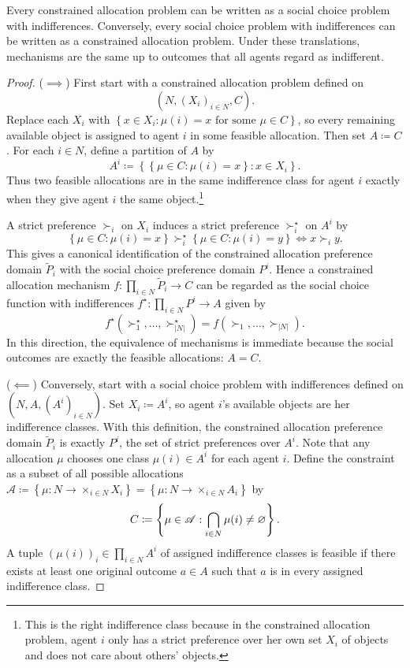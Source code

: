 \begin{proposition}
	Every constrained allocation problem can be written as a social choice problem with indifferences. Conversely, every social choice problem with indifferences can be written as a constrained allocation problem. Under these translations, mechanisms are the same up to outcomes that all agents regard as indifferent.
\end{proposition}
\begin{proof}
	($\implies$) First start with a constrained allocation problem defined on \[
		\left( N, \left( X_i \right)_{i \in N}, C \right)
	.\] 
	Replace each $X_i$ with $\left\{x \in X_i: \mu(i) = x \text{ for some } \mu \in C\right\}$, so every remaining available object is assigned to agent $i$ in some feasible allocation. Then set $A \coloneqq C$.
	For each $i \in N$, define a partition of $A$ by \[
		A^i \coloneqq \left\{ \left\{\mu \in C: \mu(i) = x\right\}: x \in X_i \right\}
	.\] 
	Thus two feasible allocations are in the same indifference class for agent $i$ exactly when they give agent $i$ the same object.\footnote{This is the right indifference class because in the constrained allocation problem, agent $i$ only has a strict preference over her own set $X_i$ of objects and does not care about others' objects.}

	A strict preference $\succ_i$ on $X_i$ induces a strict preference $\succ_i^\star$ on $A^i$ by \[
		\left\{\mu \in C: \mu(i) = x\right\} \succ_i^\star \left\{\mu \in C: \mu(i) = y\right\} \iff x \succ_i y
	.\] 
	This gives a canonical identification of the constrained allocation preference domain $\tilde{P}_i$ with the social choice preference domain $P^i$.
	Hence a constrained allocation mechanism $f: \prod_{i \in N}^{} \tilde{P}_i \to C$ can be regarded as the social choice function with indifferences $f^\star: \prod_{i \in N}^{} P^i \to A$ given by \[
		f^\star\left( \succ_1^\star,\ldots,\succ_{\left| N \right|}^\star \right)
		=
		f\left( \succ_1,\ldots,\succ_{\left| N \right|} \right)
	.\] 
	In this direction, the equivalence of mechanisms is immediate because the social outcomes are exactly the feasible allocations: $A=C$.

	\medskip

	($\impliedby$) Conversely, start with a social choice problem with indifferences defined on $\left( N,A,\left( A^i \right)_{i \in N} \right)$.
	Set $X_i \coloneqq A^i$, so agent $i$'s available objects are her indifference classes.
	With this definition, the constrained allocation preference domain $\tilde{P}_i$ is exactly $P^i$, the set of strict preferences over $A^i$.
	Note that any allocation $\mu$ chooses one class $\mu(i) \in A^i$ for each agent $i$.
	Define the constraint as a subset of all possible allocations $\mathscr{A} \coloneqq \left\{\mu: N \to \times_{i \in N} X_i \right\}= \left\{\mu: N \to \times_{i \in N} A_i\right\}$ by \[
		C \coloneqq \left\{\mu \in \mathscr{A}: \bigcap_{i \in N}^{} \mu(i) \ne \varnothing \right\}
	.\] 
	A tuple $(\mu(i))_i	\in \prod_{i \in N}^{} A^i$ of assigned indifference classes is feasible if there exists at least one original outcome $a \in A$ such that $a$ is in every assigned indifference class.


\end{proof}
